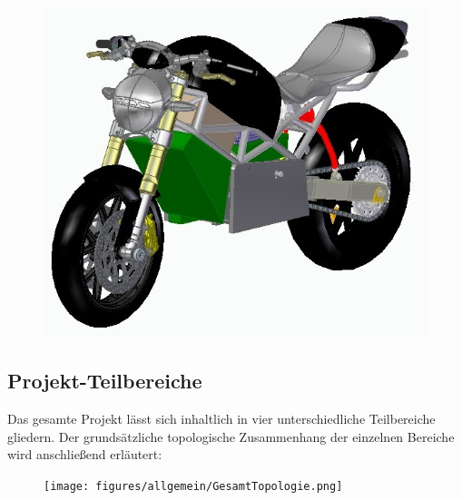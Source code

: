 \begin{figure} [H]
	\begin{center}
		\includegraphics[scale=0.7] {figures/mechanik/Ducati2.jpg}
	\end{center}
\end{figure}

\newpage


\subsection{Projekt-Teilbereiche}
Das gesamte Projekt lässt sich inhaltlich in vier unterschiedliche Teilbereiche gliedern. Der grundsätzliche topologische Zusammenhang der einzelnen Bereiche wird anschließend erläutert:

\begin{figure}[H]
	\begin{center}

		\texttt{[image: figures/allgemein/GesamtTopologie.png]}

	\end{center}
\end{figure}


